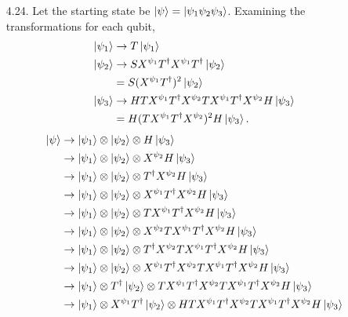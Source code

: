 \documentclass[a4paper,12pt]{article}
\begin{document}
\begin{enumerate}
    \item[4.24.] Let the starting state be $\ket{\psi} = \ket{\psi_1 \psi_2 \psi_3}$. Examining the transformations for each qubit,
        \begin{align*}
            \ket{\psi_1} &\rightarrow T \ket{\psi_1} \\
            \ket{\psi_2} &\rightarrow S X^{\psi_1} T^\dagger X^{\psi_1} T^\dagger \ket{\psi_2} \\
            &= S (X^{\psi_1} T^\dagger)^2 \ket{\psi_2} \\
            \ket{\psi_3} &\rightarrow H T X^{\psi_1} T^\dagger X^{\psi_2} T X^{\psi_1} T^\dagger X^{\psi_2} H \ket{\psi_3} \\
            &= H (T X^{\psi_1} T^\dagger X^{\psi_2})^2 H \ket{\psi_3}.
        \end{align*}
        \iffalse
        \begin{align*}
            \ket{\psi} &\rightarrow \ket{\psi_1} \otimes \ket{\psi_2} \otimes H \ket{\psi_3} \\
            &\rightarrow \ket{\psi_1} \otimes \ket{\psi_2} \otimes X^{\psi_2} H \ket{\psi_3} \\
            &\rightarrow \ket{\psi_1} \otimes \ket{\psi_2} \otimes T^\dagger X^{\psi_2} H \ket{\psi_3} \\
            &\rightarrow \ket{\psi_1} \otimes \ket{\psi_2} \otimes X^{\psi_1} T^\dagger X^{\psi_2} H \ket{\psi_3} \\
            &\rightarrow \ket{\psi_1} \otimes \ket{\psi_2} \otimes T X^{\psi_1} T^\dagger X^{\psi_2} H \ket{\psi_3} \\
            &\rightarrow \ket{\psi_1} \otimes \ket{\psi_2} \otimes X^{\psi_2} T X^{\psi_1} T^\dagger X^{\psi_2} H \ket{\psi_3} \\
            &\rightarrow \ket{\psi_1} \otimes \ket{\psi_2} \otimes T^\dagger X^{\psi_2} T X^{\psi_1} T^\dagger X^{\psi_2} H \ket{\psi_3} \\
            &\rightarrow \ket{\psi_1} \otimes \ket{\psi_2} \otimes X^{\psi_1} T^\dagger X^{\psi_2} T X^{\psi_1} T^\dagger X^{\psi_2} H \ket{\psi_3} \\
            &\rightarrow \ket{\psi_1} \otimes T^\dagger \ket{\psi_2} \otimes T X^{\psi_1} T^\dagger X^{\psi_2} T X^{\psi_1} T^\dagger X^{\psi_2} H \ket{\psi_3} \\
            &\rightarrow \ket{\psi_1} \otimes X^{\psi_1} T^\dagger \ket{\psi_2} \otimes H T X^{\psi_1} T^\dagger X^{\psi_2} T X^{\psi_1} T^\dagger X^{\psi_2} H \ket{\psi_3} \\

\end{align*}
\end{enumerate}
\end{document}
